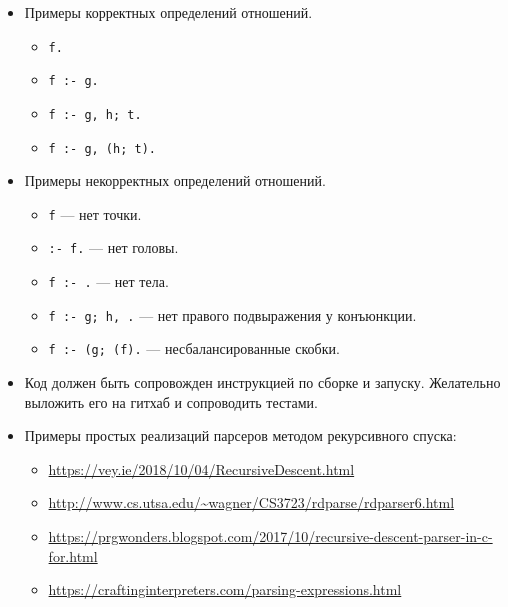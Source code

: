 \documentclass[12pt]{article}
\begin{document}
\begin{enumerate}
{\begin{itemize}
\begin{itemize}
        \item Тело и штопор могут отсутствовать.
        \item Где угодно могут встречаться пробельные символы: советую использовать лексер.
      \end{itemize}
      \item Примеры корректных определений отношений.
      \begin{itemize}
        \item \verb!f.!
        \item \verb!f :- g.!
        \item \verb!f :- g, h; t.!
        \item \verb!f :- g, (h; t).!
      \end{itemize}
      \item Примеры некорректных определений отношений.
      \begin{itemize}
        \item \verb!f! --- нет точки.
        \item \verb!:- f.! --- нет головы.
        \item \verb!f :- .! --- нет тела.
        \item \verb!f :- g; h, .! --- нет правого подвыражения у конъюнкции.
        \item \verb!f :- (g; (f).! --- несбалансированные скобки.
      \end{itemize}
      \item Код должен быть сопровожден инструкцией по сборке и запуску. Желательно выложить его на гитхаб и сопроводить тестами.
      \item Примеры простых реализаций парсеров методом рекурсивного спуска:
      \begin{itemize}
        \item \url{https://vey.ie/2018/10/04/RecursiveDescent.html}
        \item \url{http://www.cs.utsa.edu/~wagner/CS3723/rdparse/rdparser6.html}
        \item \url{https://prgwonders.blogspot.com/2017/10/recursive-descent-parser-in-c-for.html}
        \item \url{https://craftinginterpreters.com/parsing-expressions.html}
      \end{itemize}
    \end{itemize}
  }
\end{enumerate}
\end{document}
